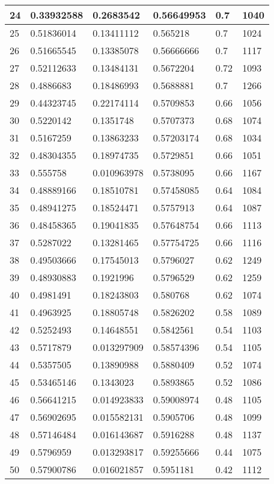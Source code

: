 \begin{longtable}{|l|l|l|l|l|l|}
24 & 0.33932588 & 0.2683542 & 0.56649953 & 0.7 & 1040 \\ \hline 
25 & 0.51836014 & 0.13411112 & 0.565218 & 0.7 & 1024 \\ \hline 
26 & 0.51665545 & 0.13385078 & 0.56666666 & 0.7 & 1117 \\ \hline 
27 & 0.52112633 & 0.13484131 & 0.5672204 & 0.72 & 1093 \\ \hline 
28 & 0.4886683 & 0.18486993 & 0.5688881 & 0.7 & 1266 \\ \hline 
29 & 0.44323745 & 0.22174114 & 0.5709853 & 0.66 & 1056 \\ \hline 
30 & 0.5220142 & 0.1351748 & 0.5707373 & 0.68 & 1074 \\ \hline 
31 & 0.5167259 & 0.13863233 & 0.57203174 & 0.68 & 1034 \\ \hline 
32 & 0.48304355 & 0.18974735 & 0.5729851 & 0.66 & 1051 \\ \hline 
33 & 0.555758 & 0.010963978 & 0.5738095 & 0.66 & 1167 \\ \hline 
34 & 0.48889166 & 0.18510781 & 0.57458085 & 0.64 & 1084 \\ \hline 
35 & 0.48941275 & 0.18524471 & 0.5757913 & 0.64 & 1087 \\ \hline 
36 & 0.48458365 & 0.19041835 & 0.57648754 & 0.66 & 1113 \\ \hline 
37 & 0.5287022 & 0.13281465 & 0.57754725 & 0.66 & 1116 \\ \hline 
38 & 0.49503666 & 0.17545013 & 0.5796027 & 0.62 & 1249 \\ \hline 
39 & 0.48930883 & 0.1921996 & 0.5796529 & 0.62 & 1259 \\ \hline 
40 & 0.4981491 & 0.18243803 & 0.580768 & 0.62 & 1074 \\ \hline 
41 & 0.4963925 & 0.18805748 & 0.5826202 & 0.58 & 1089 \\ \hline 
42 & 0.5252493 & 0.14648551 & 0.5842561 & 0.54 & 1103 \\ \hline 
43 & 0.5717879 & 0.013297909 & 0.58574396 & 0.54 & 1105 \\ \hline 
44 & 0.5357505 & 0.13890988 & 0.5880409 & 0.52 & 1074 \\ \hline 
45 & 0.53465146 & 0.1343023 & 0.5893865 & 0.52 & 1086 \\ \hline 
46 & 0.56641215 & 0.014923833 & 0.59008974 & 0.48 & 1105 \\ \hline 
47 & 0.56902695 & 0.015582131 & 0.5905706 & 0.48 & 1099 \\ \hline 
48 & 0.57146484 & 0.016143687 & 0.5916288 & 0.48 & 1137 \\ \hline 
49 & 0.5796959 & 0.013293817 & 0.59255666 & 0.44 & 1075 \\ \hline 
50 & 0.57900786 & 0.016021857 & 0.5951181 & 0.42 & 1112 \\ \hline 
\end{longtable}